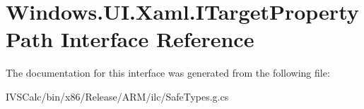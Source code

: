 \hypertarget{interface_windows_1_1_u_i_1_1_xaml_1_1_i_target_property_path}{}\section{Windows.\+U\+I.\+Xaml.\+I\+Target\+Property\+Path Interface Reference}
\label{interface_windows_1_1_u_i_1_1_xaml_1_1_i_target_property_path}


The documentation for this interface was generated from the following file\+:\begin{DoxyCompactItemize}
\item 
I\+V\+S\+Calc/bin/x86/\+Release/\+A\+R\+M/ilc/Safe\+Types.\+g.\+cs\end{DoxyCompactItemize}
